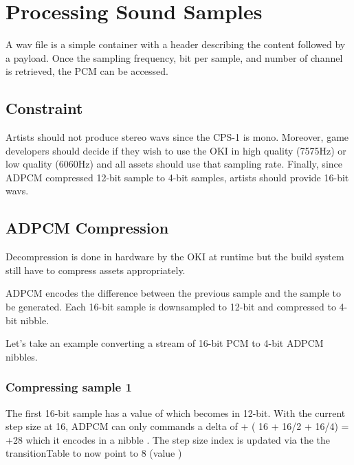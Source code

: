 





\section{Processing Sound Samples}
A wav file is a simple container with a header describing the content followed by a payload. Once the sampling frequency, bit per sample, and number of channel is retrieved, the PCM can be accessed.

\subsection{Constraint}
Artists should not produce stereo wavs since the CPS-1 is mono. Moreover, game developers should decide if they wish to use the OKI in high quality (7575Hz) or low quality (6060Hz) and all assets should use that sampling rate. Finally, since ADPCM compressed 12-bit sample to 4-bit samples, artists should provide 16-bit wavs.


\subsection{ADPCM Compression}
Decompression is done in hardware by the OKI at runtime but the build system still have to compress assets appropriately. 

ADPCM encodes the difference between the previous sample and the sample to be generated. Each 16-bit sample is downsampled to 12-bit and compressed to 4-bit nibble\cite{adpcm_specs}.





Let's take an example converting a stream of 16-bit PCM to 4-bit ADPCM nibbles.



\subsubsection{Compressing sample 1}
The first 16-bit sample has a value of  which becomes  in 12-bit. With the current step size at 16, ADPCM can only commands a delta of + ( 16 + 16/2 + 16/4) = +28 which it encodes in a nibble . The step size index is updated via the the transitionTable to now point to 8 (value )

